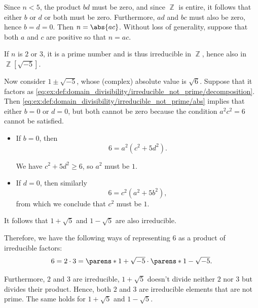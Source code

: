 \begin{example}
\begin{thmenum}
    Since \( n < 5 \), the product \( bd \) must be zero, and since \( \BbbZ \) is entire, it follows that either \( b \) or \( d \) or both must be zero. Furthermore, \( ad \) and \( bc \) must also be zero, hence \( b = d = 0 \). Then \( n = \abs{ac} \). Without loss of generality, suppose that both \( a \) and \( c \) are positive so that \( n = ac \).

    If \( n \) is \( 2 \) or \( 3 \), it is a prime number and is thus irreducible in \( \BbbZ \), hence also in \( \BbbZ[\sqrt{-5}] \).

    Now consider \( 1 \pm \sqrt{-5} \), whose (complex) absolute value is \( \sqrt 6 \). Suppose that it factors as \eqref{eq:ex:def:domain_divisibility/irreducible_not_prime/decomposition}. Then \eqref{eq:ex:def:domain_divisibility/irreducible_not_prime/abs} implies that either \( b = 0 \) or \( d = 0 \), but both cannot be zero because the condition \( a^2 c^2 = 6 \) cannot be satisfied.
    \begin{itemize}
      \item If \( b = 0 \), then
      \begin{equation*}
        6 = a^2 (c^2 + 5 d^2).
      \end{equation*}

      We have \( c^2 + 5 d^2 \geq 6 \), so \( a^2 \) must be \( 1 \).

      \item If \( d = 0 \), then similarly
      \begin{equation*}
        6 = c^2 (a^2 + 5b^2),
      \end{equation*}
      from which we conclude that \( c^2 \) must be \( 1 \).
    \end{itemize}

    It follows that \( 1 + \sqrt{5} \) and \( 1 - \sqrt{5} \) are also irreducible.

    Therefore, we have the following ways of representing \( 6 \) as a product of irreducible factors:
    \begin{equation*}
      6 = 2 \cdot 3 = \parens*{ 1 + \sqrt{-5} } \cdot \parens*{ 1 - \sqrt{-5}}.
    \end{equation*}

    Furthermore, \( 2 \) and \( 3 \) are irreducible, \( 1 + \sqrt{5} \) doesn't divide neither \( 2 \) nor \( 3 \) but divides their product. Hence, both \( 2 \) and \( 3 \) are irreducible elements that are not prime. The same holds for \( 1 + \sqrt{5} \) and \( 1 - \sqrt{5} \).
  \end{thmenum}
\end{example}

